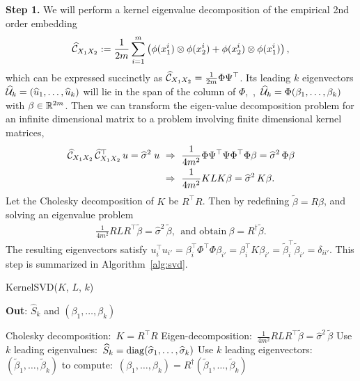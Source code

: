 \documentclass{article}
\begin{document}
{\bf Step 1.} We will perform a kernel eigenvalue decomposition of the empirical 2nd order embedding
$$
  \widehat {\mathcal{C}}_{X_1 X_2}:= \frac{1}{2m} \sum_{i=1}^{m} \left(\phi(x_1^i) \otimes \phi(x_2^i) + \phi(x_2^i) \otimes \phi(x_1^i)\right),
$$
which can be expressed succinctly as $\widehat {\mathcal{C}}_{X_1 X_2} = \frac{1}{2m} \Phi \Psi^\top$.
Its leading $k$ eigenvectors $\widehat {\mathcal{U}}_k = (\widehat u_1,\ldots,\widehat u_k)$ will lie in the span of the column of  $\Phi$,~\ie,~$\widehat {\mathcal{U}}_k = \Phi (\beta_1,\ldots,\beta_k)$ with $\beta \in \mathbb{R}^{2m}$. Then we can transform the eigen-value decomposition problem for an infinite dimensional matrix to a problem involving finite dimensional kernel matrices,
\begin{align*}
	\widehat {\mathcal{C}}_{X_1 X_2}\, \widehat {\mathcal{C}}_{X_1 X_2}^\top\, u = \widehat \sigma^2 \;u
	&~\Rightarrow~
	\frac{1}{4m^2}\Phi \Psi^\top \Psi \Phi^\top \Phi \beta = \widehat \sigma^2 \,\Phi \beta \\
	&~\Rightarrow~
	\frac{1}{4m^2} K L K \beta = \widehat \sigma^2 \,K \beta.
\end{align*}
Let the Cholesky decomposition of $K$ be $R^\top R$. Then by redefining $\widetilde{\beta}=R\beta$, and solving an eigenvalue problem
\begin{align}
 \frac{1}{4m^2} R L R^\top \widetilde{\beta} =\widehat  \sigma^2 \, \widetilde{\beta},~~\text{and obtain}~\beta = R^{\dagger} \widetilde{\beta}.
\end{align}
The resulting eigenvectors satisfy $u_i^\top u_{i'} = \beta_i^\top \Phi^\top \Phi \beta_{i'} =  \beta_{i}^\top K  \beta_{i'} =  \widetilde{\beta}_{i}^\top \widetilde{\beta}_{i'}=\delta_{ii'}$.
This step is summarized in Algorithm~\ref{alg:svd}.

\begin{algorithm}[t!]
\caption{KernelSVD($K$, $L$, $k$)}
	\textbf{Out}: $\widehat S_k$ and $(\beta_1,\ldots,\beta_k)$\\[-0.4cm]
  \begin{algorithmic}[1]
    \STATE Cholesky decomposition:\ $K=R^\top R$
    \STATE Eigen-decomposition:\ $\frac{1}{4m^2} R L R^\top \widetilde{\beta} = \widehat \sigma^2\,\widetilde{\beta}$
    \STATE Use $k$ leading eigenvalues:\ $\widehat S_k = \mathop{\mathrm{diag}}(\widehat \sigma_1,\ldots,\widehat \sigma_k)$
    \STATE Use $k$ leading eigenvectors:\ $(\widetilde{\beta}_1,\ldots,\widetilde{\beta}_k)$ to
    compute:\ $(\beta_1,\ldots,\beta_k) = R^\dagger (\widetilde{\beta}_1,\ldots,\widetilde{\beta}_k)$
  \end{algorithmic}
  \label{alg:svd}
\end{algorithm}
\end{document}
